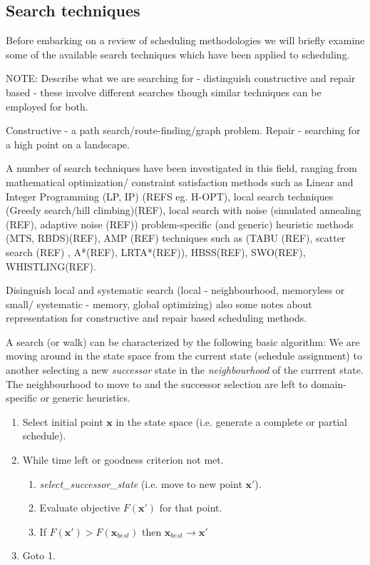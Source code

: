 \subsection{Search techniques}
Before embarking on a review of scheduling methodologies we will briefly examine some of the available search techniques which have been applied to scheduling. 

NOTE: Describe what we are searching for - distinguish constructive and repair based - these involve different searches though similar techniques can be employed for both.

Constructive - a path search/route-finding/graph problem.
Repair - searching for a high point on a landscape.

A number of search techniques have been investigated in this field, ranging from mathematical optimization/ constraint satisfaction methods such as Linear and Integer Programming (LP, IP) (REFS eg. H-OPT), local search techniques (Greedy search/hill climbing)(REF), local search with noise (simulated annealing (REF), adaptive noise (REF)) problem-specific (and generic) heuristic methods (MTS, RBDS)(REF), AMP (REF) techniques such as (TABU (REF), scatter search (REF) , A*(REF), LRTA*(REF)), HBSS(REF), SWO(REF), WHISTLING(REF). 

Disinguish local and systematic search (local - neighbourhood, memoryless or small/ systematic - memory, global optimizing) also some notes about representation for constructive and repair based scheduling methods.

A search (or walk) can be characterized by the following basic algorithm: We are moving around in the state space from the current state (schedule assignment) to another selecting a new \emph{successor} state in the \emph{neighbourhood} of the currrent state. The neighbourhood to move to and the successor selection are left to domain-specific or generic heuristics.


\begin{enumerate}  
\item Select initial point $\mathbf{x}$ in the state space (i.e. generate a complete or partial schedule).
\item While time left or goodness criterion not met.
\begin{enumerate}
 \item \emph{select\_successor\_state} (i.e. move to new point $\mathbf{x}'$).
 \item Evaluate objective $F(\mathbf{x}')$ for that point.
 \item If $F(\mathbf{x}') > F(\mathbf{x}_{best})$ then $\mathbf{x}_{best} \rightarrow \mathbf{x}'$
\end{enumerate}
\item Goto 1.
\end{enumerate}



